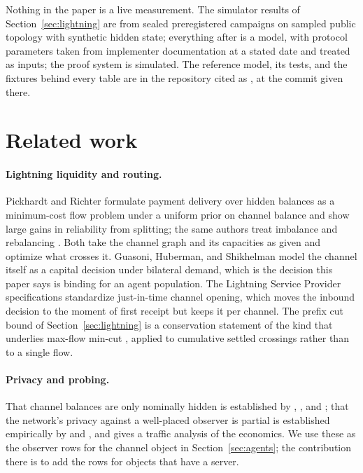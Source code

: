 \documentclass[11pt]{article}
\theoremstyle{plain}
\theoremstyle{definition}
\theoremstyle{remark}
\begin{document}
Nothing in the paper is a live measurement. The simulator results of Section~\ref{sec:lightning} are from sealed preregistered campaigns on sampled public topology with synthetic hidden state; everything after is a model, with protocol parameters taken from implementer documentation at a stated date and treated as inputs; the proof system is simulated. The reference model, its tests, and the fixtures behind every table are in the repository cited as \citet{spiral2026}, at the commit given there.

\section{Related work}

\paragraph{Lightning liquidity and routing.} Pickhardt and Richter \citep{pickhardt2021optimally} formulate payment delivery over hidden balances as a minimum-cost flow problem under a uniform prior on channel balance and show large gains in reliability from splitting; the same authors treat imbalance and rebalancing \citep{pickhardt2020imbalance}. Both take the channel graph and its capacities as given and optimize what crosses it. Guasoni, Huberman, and Shikhelman \citep{guasoni2024lightning} model the channel itself as a capital decision under bilateral demand, which is the decision this paper says is binding for an agent population. The Lightning Service Provider specifications \citep{lsps2} standardize just-in-time channel opening, which moves the inbound decision to the moment of first receipt but keeps it per channel. The prefix cut bound of Section~\ref{sec:lightning} is a conservation statement of the kind that underlies max-flow min-cut \citep{fordfulkerson1956}, applied to cumulative settled crossings rather than to a single flow.

\paragraph{Privacy and probing.} That channel balances are only nominally hidden is established by \citet{herrera2019difficulty}, \citet{tikhomirov2020probing}, and \citet{nisslmueller2020confidentiality}; that the network's privacy against a well-placed observer is partial is established empirically by \citet{kappos2021empirical} and \citet{romiti2021crosslayer}, and \citet{beres2021cryptoeconomic} gives a traffic analysis of the economics. We use these as the observer rows for the channel object in Section~\ref{sec:agents}; the contribution there is to add the rows for objects that have a server.
\end{document}
